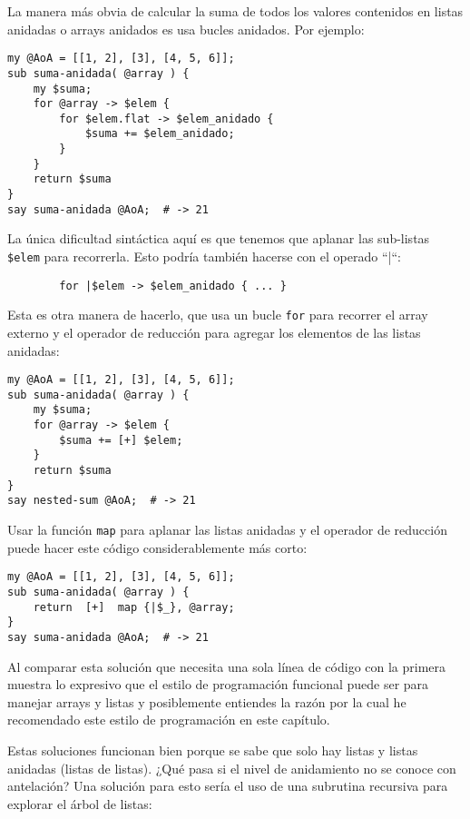 La manera más obvia de calcular la suma de todos los valores
contenidos en listas anidadas o arrays anidados es usa bucles
anidados. Por ejemplo:

\begin{verbatim}
my @AoA = [[1, 2], [3], [4, 5, 6]];
sub suma-anidada( @array ) { 
    my $suma; 
    for @array -> $elem { 
        for $elem.flat -> $elem_anidado {
            $suma += $elem_anidado;
        }
    } 
    return $suma
}
say suma-anidada @AoA;  # -> 21
\end{verbatim}

La única dificultad sintáctica aquí es que tenemos
que aplanar las sub-listas \verb|$elem| para recorrerla.
Esto podría también hacerse con el operado ``|``:
\begin{verbatim}
        for |$elem -> $elem_anidado { ... }
\end{verbatim}

Esta es otra manera de hacerlo, que usa un bucle {\tt for}
para recorrer el array externo y el operador de reducción 
para agregar los elementos de las listas anidadas:

\begin{verbatim}
my @AoA = [[1, 2], [3], [4, 5, 6]];
sub suma-anidada( @array ) { 
    my $suma; 
    for @array -> $elem { 
        $suma += [+] $elem;
    } 
    return $suma
}
say nested-sum @AoA;  # -> 21
\end{verbatim}

Usar la función {\tt map} para aplanar las listas anidadas
y el operador de reducción puede hacer este código 
considerablemente más corto:

\begin{verbatim}
my @AoA = [[1, 2], [3], [4, 5, 6]];
sub suma-anidada( @array ) { 
    return  [+]  map {|$_}, @array;
}
say suma-anidada @AoA;  # -> 21
\end{verbatim}

Al comparar esta solución que necesita una sola línea
de código con la primera muestra lo expresivo que 
el estilo de programación funcional puede ser para manejar
arrays y listas y posiblemente entiendes la razón
por la cual he recomendado este estilo de programación
en este capítulo.

Estas soluciones funcionan bien porque se sabe
que solo hay listas y listas anidadas (listas de listas).
¿Qué pasa si el nivel de anidamiento no se conoce con 
antelación? Una solución para esto sería el uso de una
subrutina recursiva para explorar el árbol de listas:


